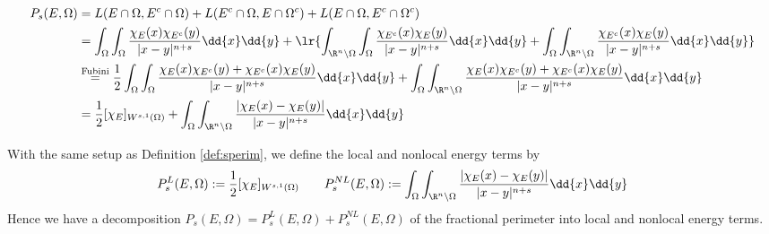 \documentclass[../main.tex]{subfiles}
\begin{document}
\begin{align*}
    P_{s}(E,\Omega)&= L(E\cap \Omega, E^{c} \cap \Omega) + L(E^{c}\cap \Omega, E\cap \Omega^{c}) + L(E\cap \Omega, E^{c}\cap \Omega^{c}) \\
    &= \int_{\Omega}\int_{\Omega}\frac{\chi_{E}(x) \chi_{E^{c}}(y)}{|x-y|^{n+s}}\dd{x}\dd{y} + \lr{\int_{\R^{n}\setminus\Omega}\int_{\Omega}\frac{\chi_{E^{c}}(x) \chi_{E}(y)}{|x-y|^{n+s}}\dd{x}\dd{y} + \int_{\Omega}\int_{\R^{n}\setminus\Omega}\frac{\chi_{E^{c}}(x) \chi_{E}(y)}{|x-y|^{n+s}}\dd{x}\dd{y} } \\
    &\overset{\text{Fubini}}{=} \frac{1}{2}\int_{\Omega}\int_{\Omega} \frac{\chi_{E}(x) \chi_{E^{c}}(y) + \chi_{E^{c}}(x) \chi_{E}(y)}{|x-y|^{n+s}}\dd{x}\dd{y} + \int_{\Omega}\int_{\R^{n}\setminus \Omega} \frac{\chi_{E}(x) \chi_{E^{c}}(y) + \chi_{E^{c}}(x) \chi_{E}(y)}{|x-y|^{n+s}}\dd{x}\dd{y}\\
    &= \frac{1}{2}[\chi_{E}]_{W^{s,1}(\Omega)} + \int_{\Omega}\int_{\R^{n}\setminus \Omega} \frac{| \chi_{E}(x) - \chi_{E}(y)|}{|x-y|^{n+s}}\dd{x}\dd{y} 
\end{align*}


\begin{definition}
    With the same setup as Definition \ref{def:sperim}, we define the local and nonlocal energy terms by
    \[
        P_{s}^{L}(E,\Omega) := \frac{1}{2}[\chi_{E}]_{W^{s,1}(\Omega)} \quad \quad P_{s}^{NL}(E,\Omega) := \int_{\Omega}\int_{\R^{n}\setminus \Omega} \frac{| \chi_{E}(x) - \chi_{E}(y)|}{|x-y|^{n+s}}\dd{x}\dd{y} 
    \]
    Hence we have a decomposition $ P_{s}(E,\Omega) = P_{s}^{L}(E,\Omega) + P_{s}^{NL}(E,\Omega) $ of the fractional perimeter into local and nonlocal energy terms.
\end{definition}
\end{document}
